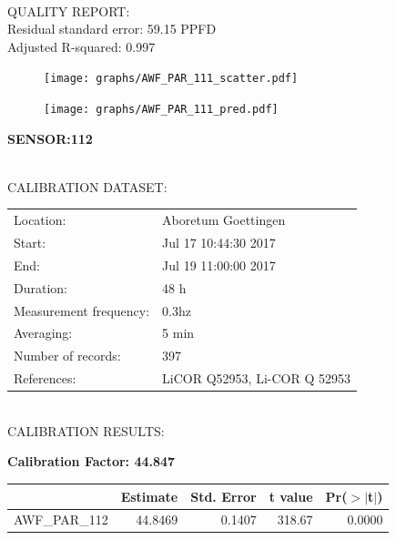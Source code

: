 \documentclass[oneside]{report}
\begin{document}
\hrulefill\\
QUALITY REPORT:\\
Residual standard error: 59.15 PPFD\\
Adjusted R-squared: 0.997



\begin{figure}[H]
  \centering
  \texttt{[image: graphs/AWF\_PAR\_111\_scatter.pdf]}
\end{figure}




\begin{figure}[H]
  \centering
  \texttt{[image: graphs/AWF\_PAR\_111\_pred.pdf]}
\end{figure}

\pagebreak


\begin{center}
\large{\textbf{SENSOR:112}}\\
\end{center}

\hrulefill\\
CALIBRATION DATASET:\\
\begin{table}[h!]
  \centering
  \label{tab:table1}
  \begin{tabular}{ll}
    Location: & Aboretum Goettingen\\ 
    
    
    Start:  & Jul 17 10:44:30 2017 \\
    End:   & Jul 19 11:00:00 2017\\ 
    Duration: & 48 h\\
    Measurement frequency: & 0.3hz\\
    Averaging:  &5 min\\
    Number of records: & 397 \\
    References: & LiCOR Q52953, Li-COR Q 52953 \\
  \end{tabular}
\end{table}

\hrulefill\\
CALIBRATION RESULTS:\\


\begin{center}
\textbf{\large{Calibration Factor: 44.847}}\\
\end{center}
\begin{table}[ht]
\centering
\begin{tabular}{rrrrr}
  \hline
 & Estimate & Std. Error & t value & Pr($>$$|$t$|$) \\ 
  \hline
AWF\_PAR\_112 & 44.8469 & 0.1407 & 318.67 & 0.0000 \\ 
   \hline
\end{tabular}
\end{table}
\end{document}

